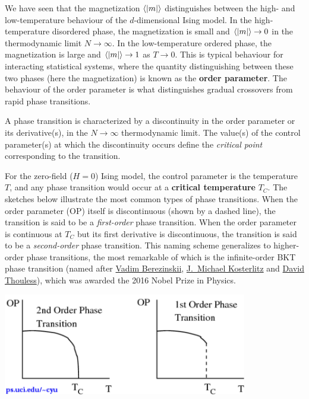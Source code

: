 We have seen that the magnetization $\left\langle |m| \right\rangle$ distinguishes between the high- and low-temperature behaviour of the $d$-dimensional Ising model.
In the high-temperature disordered phase, the magnetization is small and $\left\langle |m| \right\rangle \to 0$ in the thermodynamic limit $N \to \infty$.
In the low-temperature ordered phase, the magnetization is large and $\left\langle |m| \right\rangle \to 1$ as $T \to 0$.
This is typical behaviour for interacting statistical systems, where the quantity distinguishing between these two phases (here the magnetization) is known as the \textbf{order parameter}.
The behaviour of the order parameter is what distinguishes gradual crossovers from rapid phase transitions.

\begin{shaded}
  A phase transition is characterized by a discontinuity in the order parameter or its derivative(s), in the $N \to \infty$ thermodynamic limit.
  The value(s) of the control parameter(s) at which the discontinuity occurs define the \textit{critical point} corresponding to the transition.
\end{shaded}

For the zero-field ($H = 0$) Ising model, the control parameter is the temperature $T$, and any phase transition would occur at a \textbf{critical temperature} $T_C$.
The sketches below illustrate the most common types of phase transitions.
When the order parameter (OP) itself is discontinuous (shown by a dashed line), the transition is said to be a \textit{first-order} phase transition.
When the order parameter is continuous at $T_C$ but its first derivative is discontinuous, the transition is said to be a \textit{second-order} phase transition.
This naming scheme generalizes to higher-order phase transitions, the most remarkable of which is the infinite-order BKT phase transition (named after \href{https://en.wikipedia.org/wiki/Vadim_Berezinskii}{Vadim Berezinskii}, \href{https://en.wikipedia.org/wiki/J._Michael_Kosterlitz}{J.\ Michael Kosterlitz} and \href{https://en.wikipedia.org/wiki/David_J._Thouless}{David Thouless}), which was awarded the 2016 Nobel Prize in Physics.

\begin{center}\includegraphics[width=0.8\textwidth]{figs/week10_transitions.pdf}\end{center}

